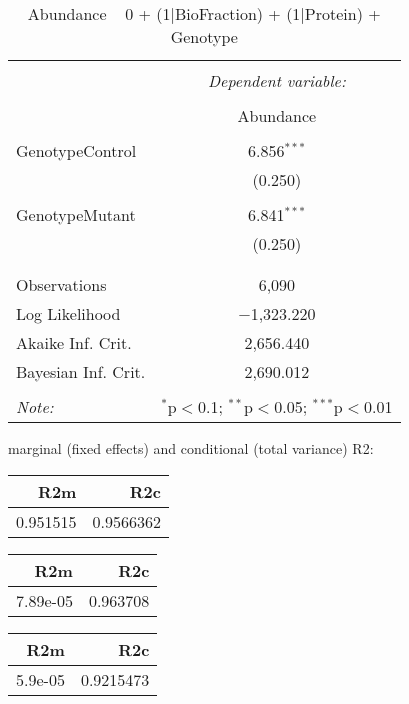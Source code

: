 \documentclass[11pt]{report}
\begin{document}
\begin{table}[!htbp] \centering 
  \caption{Abundance ~ 0 + (1|BioFraction) + (1|Protein) + Genotype} 
  \label{} 
\begin{tabular}{@{\extracolsep{5pt}}lc} 
\\[-1.8ex]\hline 
\hline \\[-1.8ex] 
 & \multicolumn{1}{c}{\textit{Dependent variable:}} \\ 
\cline{2-2} 
\\[-1.8ex] & Abundance \\ 
\hline \\[-1.8ex] 
 GenotypeControl & 6.856$^{***}$ \\ 
  & (0.250) \\ 
  & \\ 
 GenotypeMutant & 6.841$^{***}$ \\ 
  & (0.250) \\ 
  & \\ 
\hline \\[-1.8ex] 
Observations & 6,090 \\ 
Log Likelihood & $-$1,323.220 \\ 
Akaike Inf. Crit. & 2,656.440 \\ 
Bayesian Inf. Crit. & 2,690.012 \\ 
\hline 
\hline \\[-1.8ex] 
\textit{Note:}  & \multicolumn{1}{r}{$^{*}$p$<$0.1; $^{**}$p$<$0.05; $^{***}$p$<$0.01} \\ 
\end{tabular} 
\end{table} 
marginal (fixed effects) and conditional (total variance) R2:

\begin{tabular}{r|r}
\hline
R2m & R2c\\
\hline
0.951515 & 0.9566362\\
\hline
\end{tabular}

\begin{tabular}{r|r}
\hline
R2m & R2c\\
\hline
7.89e-05 & 0.963708\\
\hline
\end{tabular}

\begin{tabular}{r|r}
\hline
R2m & R2c\\
\hline
5.9e-05 & 0.9215473\\
\hline
\end{tabular}
\end{document}
